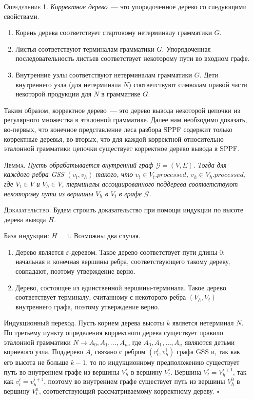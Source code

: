\textsc{Определение 1.} 
\emph{Корректное дерево}~--- это упорядоченное дерево со следующими свойствами.
\begin{enumerate}
  \item Корень дерева соответствует стартовому нетерминалу грамматики $G$.
  \item Листья соответствуют терминалам грамматики $G$. Упорядоченная последовательность листьев соответствует некоторому пути во входном графе.
  \item Внутренние узлы соответствуют нетерминалам грамматики $G$. Дети внутреннего узла (для нетерминала $N$) соответствуют символам правой части некоторой продукции для $N$ в грамматике $G$.
\end{enumerate}

Таким образом, корректное дерево~--- это дерево вывода некоторой цепочки из регулярного множества в эталонной грамматике. Далее нам необходимо доказать, во-первых, что конечное представление леса разбора SPPF содержит только корректные деревья, во-вторых, что для каждой корректной относительно эталонной грамматики цепочки существует корректное дерево вывода в SPPF. 

\textsc{Лемма.}
\textit{Пусть обрабатывается внутренний граф $\mathcal{G}=(V,E)$. Тогда для каждого ребра GSS $(v_{t}, v_{h})$ такого, что $v_{t} \in V_{t}.processed$, $v_{h} \in V_{h}.processed$, где $V_{t} \in V$ и $V_{h} \in V$, терминалы ассоциированного поддерева соответствуют некоторому пути из вершины $V_{h}$ в $V_{t}$ в графе $\mathcal{G}$.}

\textsc{Доказательство.}
Будем строить доказательство при помощи индукции по высоте дерева вывода $H$. 

База индукции: $H=1$. Возможны два случая.
\begin{enumerate}
  \item Дерево является $\varepsilon$-деревом. Такое дерево соответствует пути длины $0$; начальная и конечная вершины ребра, соответствующего такому дереву, совпадают, поэтому утверждение верно.
  \item Дерево, состоящее из единственной вершины-терминала. Такое дерево соответствует терминалу, считанному с некоторого ребра $(V_{h}, V_{t})$ внутреннего графа, поэтому утверждение верно. 
\end{enumerate}  

Индукционный переход. Пусть корнем дерева высоты $k$ является нетерминал $N$. По третьему пункту определения корректного дерева существует правило эталонной грамматики $N \rightarrow A_{0}, A_{1}, \dots, A_{n}$, где $A_{0}, A_{1}, \dots, A_{n}$ являются детьми корневого узла. Поддерево $A_{i}$ связано с ребром $(v_{t}^{i}, v_{h}^{i})$ графа GSS и, так как его высота не больше $k-1$, то по индукционному предположению существует путь во внутреннем графе из вершины $V_{h}^{i}$ в вершину $V_{t}^{i}$. Вершина $V_{t}^{i} = V_{h}^{i+1}$, так как $v_{t}^{i} = v_{h}^{i+1}$, поэтому во внутреннем графе существует путь из вершины $V_{h}^{0}$ в вершину $V_{t}^{n}$, соответствующий рассматриваемому корректному дереву. $\square$

